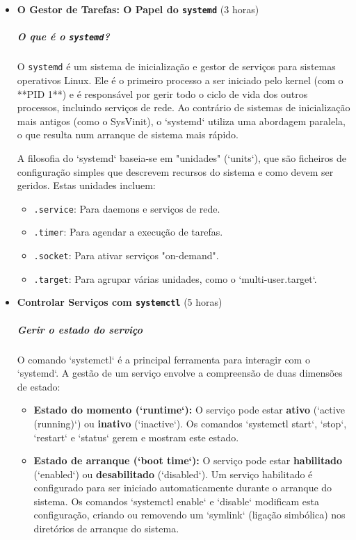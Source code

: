 \documentclass[10pt,a4paper]{article}
\begin{document}
	\begin{itemize}
		\item \textbf{O Gestor de Tarefas: O Papel do \texttt{systemd}} (3 horas)
		\subparagraph{O que é o \texttt{systemd}?} O \texttt{systemd} é um sistema de inicialização e gestor de serviços para sistemas operativos Linux. Ele é o primeiro processo a ser iniciado pelo kernel (com o **PID 1**) e é responsável por gerir todo o ciclo de vida dos outros processos, incluindo serviços de rede. Ao contrário de sistemas de inicialização mais antigos (como o SysVinit), o `systemd` utiliza uma abordagem paralela, o que resulta num arranque de sistema mais rápido.
		
		A filosofia do `systemd` baseia-se em "unidades" (`units`), que são ficheiros de configuração simples que descrevem recursos do sistema e como devem ser geridos. Estas unidades incluem:
		\begin{itemize}
			\item \texttt{.service}: Para daemons e serviços de rede.
			\item \texttt{.timer}: Para agendar a execução de tarefas.
			\item \texttt{.socket}: Para ativar serviços "on-demand".
			\item \texttt{.target}: Para agrupar várias unidades, como o `multi-user.target`.
		\end{itemize}
		
		\item \textbf{Controlar Serviços com \texttt{systemctl}} (5 horas)
		\subparagraph{Gerir o estado do serviço} O comando `systemctl` é a principal ferramenta para interagir com o `systemd`. A gestão de um serviço envolve a compreensão de duas dimensões de estado:
		\begin{itemize}
			\item \textbf{Estado do momento (`runtime`):} O serviço pode estar \textbf{ativo} (`active (running)`) ou \textbf{inativo} (`inactive`). Os comandos `systemctl start`, `stop`, `restart` e `status` gerem e mostram este estado.
			\item \textbf{Estado de arranque (`boot time`):} O serviço pode estar \textbf{habilitado} (`enabled`) ou \textbf{desabilitado} (`disabled`). Um serviço habilitado é configurado para ser iniciado automaticamente durante o arranque do sistema. Os comandos `systemctl enable` e `disable` modificam esta configuração, criando ou removendo um `symlink` (ligação simbólica) nos diretórios de arranque do sistema.
		\end{itemize}
		

\end{itemize}
\end{document}
